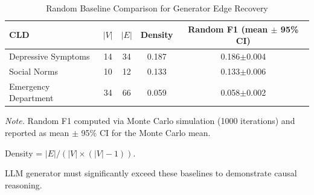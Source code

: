 \begin{table}[htbp]
\centering
\caption{Random Baseline Comparison for Generator Edge Recovery}
\label{tab:random_baseline}
\begin{tabular}{lcccc}
\toprule
\textbf{CLD} & $|V|$ & $|E|$ & \textbf{Density} & \textbf{Random F1 (mean $\pm$ 95\% CI)} \\
\midrule
Depressive Symptoms & 14 & 34 & 0.187 & 0.186$\pm$0.004 \\
Social Norms & 10 & 12 & 0.133 & 0.133$\pm$0.006 \\
Emergency Department & 34 & 66 & 0.059 & 0.058$\pm$0.002 \\
\bottomrule
\end{tabular}
\begin{tablenotes}
\small
\item \textit{Note.} Random F1 computed via Monte Carlo simulation (1000 iterations) and reported as mean $\pm$ 95\% CI for the Monte Carlo mean.
\item Density = $|E| / (|V| \times (|V|-1))$.
\item LLM generator must significantly exceed these baselines to demonstrate causal reasoning.
\end{tablenotes}
\end{table}